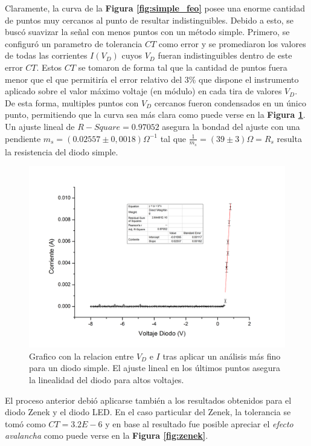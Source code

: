 \documentclass[11pt,a4paper]{article}
\begin{document}
Claramente, la curva de la \textbf{Figura \ref{fig:simple_feo}} posee una enorme cantidad de puntos muy cercanos al punto de resultar indistinguibles. Debido a esto, se buscó suavizar la señal con menos puntos con un método simple. Primero, se configuró un parametro de tolerancia $CT$ como error y se promediaron los valores de todas las corrientes $I(V_D)$ cuyos $V_D$ fueran indistinguibles dentro de este error $CT$. Estos $CT$ se tomaron de forma tal que la cantidad de puntos fuera menor que el que permitiría el error relativo del 3\% que dispone el instrumento aplicado sobre el valor máximo voltaje (en módulo) en cada tira de valores $V_D$. De esta forma, multiples puntos con $V_D$ cercanos fueron condensados en un único punto, permitiendo que la curva sea más clara como puede verse en la \textbf{Figura \ref{fig:simple_mejor}}. Un ajuste lineal de $R-Square = 0.97052$ asegura la bondad del ajuste con una pendiente $m_s = (0.02557 \pm 0,0018)\Omega^{-1}$ tal que $\frac{1}{m_s} = (39 \pm 3)\Omega= R_s$ resulta la resistencia del diodo simple.

\begin{figure}[H]
\centering
\includegraphics[scale=0.5]{simple_mejor}
   \caption{Grafico con la relacion entre $V_D$ e $I$ tras aplicar un análisis más fino para un diodo simple. El ajuste lineal en los últimos puntos asegura la linealidad del diodo para altos voltajes.}
   \label{fig:simple_mejor}
\end{figure}

El proceso anterior debió aplicarse también a los resultados obtenidos para el diodo Zenek y el diodo LED. En el caso particular del Zenek, la tolerancia se tomó como $CT = 3.2E-6$ y en base al resultado fue posible apreciar el \textit{efecto avalancha} como puede verse en la \textbf{Figura \ref{fig:zenek}}. 
\end{document}
